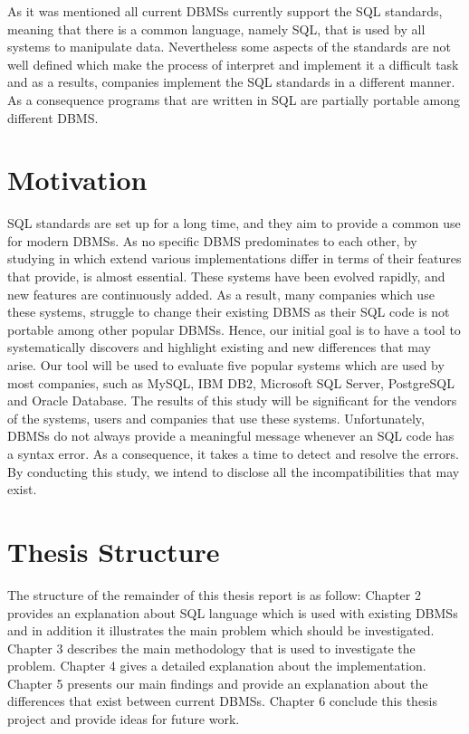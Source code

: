   
As it was mentioned all current DBMSs currently support the SQL standards, meaning that there is a common language, namely SQL, that is used by all systems to manipulate data. Nevertheless some aspects of the standards are not well defined which make the process of interpret and implement it a difficult task and as a results, companies implement the SQL standards in a different manner. As a consequence programs that are written in SQL are partially portable among different DBMS.  

 \section{Motivation}
 SQL standards are set up for a long time, and they aim to provide a common use for modern DBMSs. As no specific DBMS predominates to each other, by studying in which extend various implementations differ in terms of their features that provide, is almost essential. These systems have been evolved rapidly, and new features are continuously added. As a result, many companies which use these systems, struggle to change their existing DBMS as their SQL code is not portable among other popular DBMSs. Hence, our initial goal is to have a tool to systematically discovers and highlight existing and new differences that may arise. Our tool will be used to evaluate five popular systems which are used by most companies, such as MySQL, IBM DB2, Microsoft SQL Server, PostgreSQL and Oracle Database. The results of this study will be significant for the vendors of the systems, users and companies that use these systems. Unfortunately, DBMSs do not always provide a meaningful message whenever an SQL code has a syntax error. As a consequence, it takes a time to detect and resolve the errors. By conducting this study, we intend to disclose all the incompatibilities that may exist.
 
 \section{Thesis Structure}
 The structure of the remainder of this thesis report is as follow: Chapter 2 provides an explanation about SQL language which is used with existing DBMSs and in addition it illustrates the main problem which should be investigated. Chapter 3 describes the main methodology that is used to investigate the problem. Chapter 4 gives a detailed explanation about the implementation. Chapter 5 presents our main findings and provide an explanation about the differences that exist between current DBMSs. Chapter 6 conclude this thesis project and provide ideas for future work.  

